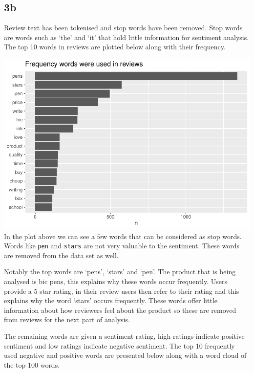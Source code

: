 \documentclass[
  11pt,
]{article}
\begin{document}
\hypertarget{b-1}{%
\subsection{3b}\label{b-1}}

Review text has been tokenised and stop words have been removed. Stop
words are words such as `the' and `it' that hold little information for
sentiment analysis. The top 10 words in reviews are plotted below along
with their frequency.

\includegraphics[width=0.5\linewidth]{Assignment-STAT702---final_files/figure-latex/3b word frequency-1}
In the plot above we can see a few words that can be considered as stop
words. Words like \texttt{pen} and \texttt{stars} are not very valuable
to the sentiment. These words are removed from the data set as well.

Notably the top words are `pens', `stars' and `pen'. The product that is
being analysed is bic pens, this explains why these words occur
frequently. Users provide a 5 star rating, in their review users then
refer to their rating and this explains why the word `stars' occurs
frequently. These words offer little information about how reviewers
feel about the product so these are removed from reviews for the next
part of analysis.

The remaining words are given a sentiment rating, high ratings indicate
positive sentiment and low ratings indicate negative sentiment. The top
10 frequently used negative and positive words are presented below along
with a word cloud of the top 100 words.
\end{document}
